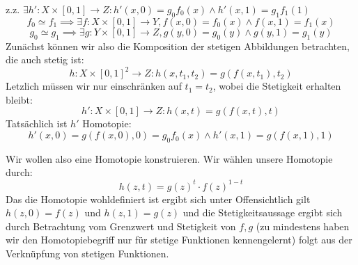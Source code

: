 \documentclass{scrartcl}
\begin{document}
\begin{aufgabe}
z.z. $ \exists {h': X\times [0,1] \to Z}: h'(x,0)=g_0 f_0(x) \land h'(x,1)=g_1 f_1(1) $\\
\[
f_0 \simeq f_1 \implies \exists f: X\times [0,1] \to Y, f(x,0)=f_0(x) \land f(x,1)=f_1(x)
\]
\[
g_0 \simeq g_1 \implies \exists g: Y\times [0,1] \to Z, g(y,0)=g_0(y) \land g(y,1)=g_1(y)
\]
Zunächst können wir also die Komposition der stetigen Abbildungen betrachten, die auch stetig ist:
\[
h: X\times [0,1]^2\to Z: h(x,t_1, t_2)=g(f(x,t_1),t_2)
\]
Letzlich müssen wir nur einschränken auf $ t_1=t_2 $, wobei die Stetigkeit erhalten bleibt:
\[
h': X\times [0,1] \to Z: h(x, t)=g(f(x,t),t)
\]
Tatsächlich ist $ h' $ Homotopie:
\[
h'(x,0)=g(f(x,0),0)=g_0f_0(x)  \land h'(x,1)=g(f(x,1),1)
\]
\end{aufgabe}
\begin{aufgabe}
Wir wollen also eine Homotopie konstruieren.  Wir wählen unsere Homotopie durch:
\[
h(z,t)=g(z)^t\cdot f(z)^{1-t}
\]
Das die Homotopie wohldefiniert ist  ergibt sich unter
Offensichtlich gilt $ h(z,0)=f(z) $ und $ h(z,1)=g(z) $ und die Stetigkeitsaussage ergibt sich durch Betrachtung vom Grenzwert und Stetigkeit von $ f,g $ (zu mindestens haben wir den Homotopiebegriff nur für stetige Funktionen kennengelernt) folgt aus der Verknüpfung von stetigen Funktionen.
\end{aufgabe}
\end{document}
